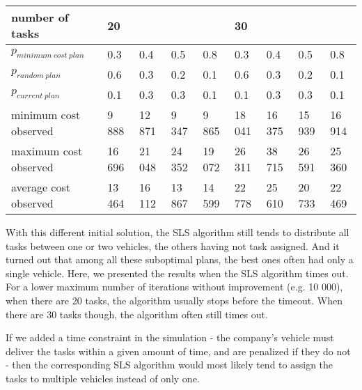 \documentclass[10pt]{article}
\begin{document}
\begin{tabular}{|l|llll|llll|}
\hline
number of tasks & 20 & & & & 30 & & & \\
\hline
$p_{minimum\ cost\ plan}$ & 0.3 & 0.4 & 0.5 & 0.8 & 0.3 & 0.4 & 0.5 & 0.8\\
$p_{random\ plan}$        & 0.6 & 0.3 & 0.2 & 0.1 & 0.6 & 0.3 & 0.2 & 0.1\\
$p_{current\ plan}$       & 0.1 & 0.3 & 0.3 & 0.1 & 0.1 & 0.3 & 0.3 & 0.1\\
\hline
minimum cost observed & 9 888  & 12 871 & 9 347 & 9 865 & 18 041  & 16 375 & 15 939 & 16 914 \\
maximum cost observed & 16 696 & 21 048 & 24 352 & 19 072 & 26 311 & 38 715 & 26 591 & 25 360\\
\hline
average cost observed & 13 464 & 16 112 & 13 867 & 14 599 & 22 778 & 25 610 & 20 733 & 22 469\\
\hline
\end{tabular}
\label{table:model_parameters_2}
\vspace{4mm}

With this different initial solution, the SLS algorithm still tends to distribute all tasks between one or two vehicles, the others having not task assigned.
And it turned out that among all these suboptimal plans, the best ones often had only a single vehicle.
Here, we presented the results when the SLS algorithm times out. For a lower maximum number of iterations without improvement (e.g. 10 000), when there are 20 tasks, the algorithm usually stops before the timeout. When there are 30 tasks though, the algorithm often still times out.

If we added a time constraint in the simulation - the company's vehicle must deliver the tasks within a given amount of time, and are penalized if they do not - then the corresponding SLS algorithm would most likely tend to assign the tasks to multiple vehicles instead of only one.
\end{document}
